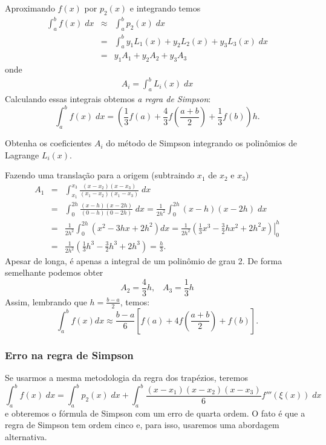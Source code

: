 Aproximando $f(x)$ por $p_2(x)$ e integrando temos
\begin{eqnarray}
\int_a^bf(x)\;dx &\approx&\int_a^b p_2(x) \;dx \\
               &=&\int_a^b y_1L_1(x) + y_2L_2(x)  + y_3L_3(x) \;dx \\
               &=&y_1 A_1 + y_2A_2  + y_3A_3
\end{eqnarray}
onde
\begin{eqnarray}
  A_i = \int_a^b L_i(x) \;dx
\end{eqnarray}
Calculando essas integrais obtemos \emph{a regra de Simpson}:
\begin{equation}
\int_a^bf(x)\;dx=\left(\frac{1}{3}f(a)+\frac{4}{3}f\left(\frac{a+b}{2}\right)+\frac{1}{3}f(b)\right)h.
\end{equation}

\begin{ex}
Obtenha os coeficientes $A_i$ do método de Simpson  integrando os polinômios de Lagrange $L_i(x)$.

Fazendo uma translação para a origem (subtraindo $x_1$ de $x_2$ e $x_3$)
\begin{eqnarray}
   A_1 &=& \int_{x_1}^{x_3} \frac{(x-x_2)(x-x_3)}{(x_1-x_2)(x_1-x_3)}\;dx \\
       &=& \int_0^{2h} \frac{(x-h)(x-2h)}{(0-h)(0-2h)}\;dx
        =  \frac{1}{2h^2} \int_0^{2h} (x-h)(x-2h)\;dx \\
        &=& \frac{1}{2h^2} \int_0^{2h} \left(x^2 -3hx+2h^2\right)dx
        =  \frac{1}{2h^2} \left.\left(\frac{1}{3}x^3 -\frac{3}{2}hx^2+2h^2x\right)\right|_0^h \\
       &=& \frac{1}{2h^2} \left(\frac{1}{3}h^3 -\frac{3}{2}h^3+2h^3\right)
      = \frac{h}{3}.
\end{eqnarray}
Apesar de longa, é apenas a integral de um polinômio de grau 2. De forma semelhante podemos obter
\begin{equation}
A_2 = \frac{4}{3}h, \;\;\; A_3 = \frac{1}{3}h
\end{equation}
Assim, lembrando que $h=\frac{b-a}{2}$, temos:
\begin{equation}
 \int_a^b f(x)dx \approx \frac{b-a}{6}\left[f(a)+4f\left(\frac{a+b}{2}\right)+f(b)\right].
 \end{equation}

\end{ex}



\subsubsection{Erro na regra de Simpson}
Se usarmos a mesma metodologia da regra dos trapézios, teremos
\begin{equation}
\int_a^bf(x)\;dx=\int_a^bp_2(x)\;dx+\int_a^b\frac{(x-x_1)(x-x_2)(x-x_3)}{6}f'''(\xi(x))\;dx
\end{equation}
e obteremos o fórmula de Simpson com um erro de quarta ordem. O fato é que a regra de Simpson tem ordem cinco e, para isso, usaremos uma abordagem alternativa.

